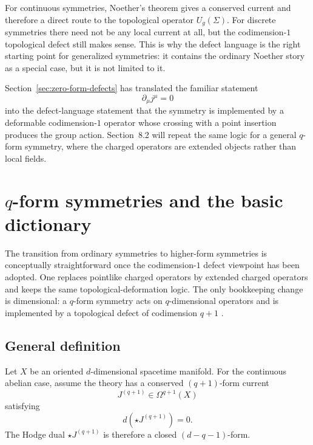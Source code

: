 \begin{remark}\label{rem:noether-vs-defect}
For continuous symmetries, Noether's theorem gives a conserved current and therefore a direct route to the topological operator $U_g(\Sigma)$. For discrete symmetries there need not be any local current at all, but the codimension-$1$ topological defect still makes sense. This is why the defect language is the right starting point for generalized symmetries: it contains the ordinary Noether story as a special case, but it is not limited to it.
\end{remark}

\begin{remark}\label{rem:zero-form-forward}
Section~\ref{sec:zero-form-defects} has translated the familiar statement
\begin{equation*}
\partial_\mu j^\mu = 0
\end{equation*}
into the defect-language statement that the symmetry is implemented by a deformable codimension-$1$ operator whose crossing with a point insertion produces the group action. Section~8.2 will repeat the same logic for a general $q$-form symmetry, where the charged operators are extended objects rather than local fields.
\end{remark}

\section{\texorpdfstring{$q$}{q}-form symmetries and the basic dictionary}\label{sec:qform-dictionary}

The transition from ordinary symmetries to higher-form symmetries is conceptually straightforward once the codimension-$1$ defect viewpoint has been adopted. One replaces pointlike charged operators by extended charged operators and keeps the same topological-deformation logic. The only bookkeeping change is dimensional: a $q$-form symmetry acts on $q$-dimensional operators and is implemented by a topological defect of codimension $q+1$ \cite{GKSW2015,Bhardwaj2023Lectures}.

\subsection{General definition}

\begin{assumption}\label{ass:qform-standing}
Let $X$ be an oriented $d$-dimensional spacetime manifold. For the continuous abelian case, assume the theory has a conserved $(q+1)$-form current
\begin{equation*}
J^{(q+1)}\in \Omega^{q+1}(X)
\end{equation*}
satisfying
\begin{equation}\label{eq:qform-conservation}
d(\star J^{(q+1)})=0.
\end{equation}
The Hodge dual $\star J^{(q+1)}$ is therefore a closed $(d-q-1)$-form.
\end{assumption}

